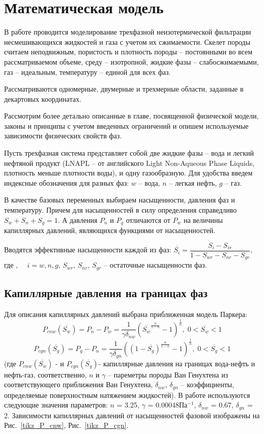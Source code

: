 %
\section{Математическая модель}
%
В работе проводится моделирование трехфазной неизотермической фильтрации 
несмешивающихся жидкостей и газа с учетом их сжимаемости. Скелет породы
считаем неподвижным, пористость и плотность породы -- постоянными во всем
рассматриваемом объеме, среду -- изотропной, жидкие фазы -- слабосжимаемыми,
газ -- идеальным, температуру -- единой для всех фаз.

Рассматриваются одномерные, двумерные и трехмерные
области, заданные в декартовых координатах.

Рассмотрим более детально описанные в главе, посвященной физической
модели, законы и принципы с учетом введенных ограничений и опишем
используемые зависимости физических свойств фаз.

Пусть трехфазная система представляет собой две жидкие фазы -- вода и легкий
нефтяной продукт (LNAPL -- от английского Light Non-Aqueous Phase Liquids,
плотность меньше плотности воды), и одну газообразную.
Для удобства введем индексные обозначения для разных фаз: $w$ -- вода, $n$ --
легкая нефть, $g$ -- газ.

В качестве базовых переменных выбираем насыщенности, давления фаз и температуру.
Причем для насыщенностей в силу определения справедливо  $S_w + S_n + S_g = 1$.
А давления $P_n$ и $P_g$ отличаются от $P_w$ на величины капиллярных
давлений, являющихся функциями от насыщенностей.

Вводятся эффективные насыщенности каждой из фаз:
$\overline{S_i}={\dfrac{S_i-S_{ir}}{1-S_{wr}-S_{nr}-S_{gr}}}$, где , ${\quad}i=w,n,g$, $S_{wr}$,
$S_{nr}$, $S_{gr}$ -- остаточные насыщенности фаз.

\subsection{Капиллярные давления на границах фаз}
Для описания
капиллярных давлений выбрана приближенная модель Паркера\cite{Parker}:
$$P_{cnw}(\overline{S_w})=P_n-P_w={\frac{1}{\gamma \delta_{nw}}}
\left( \overline{S_w}^{\frac{n}{1-n}}-1 \right)^\frac{1}{n},\;0<\overline{S_w}<1 $$
$$P_{cgn}(\overline{S_g})=P_g-P_n={\frac{1}{\gamma \delta_{gn}}}
\left( (1-\overline{S_g})^{\frac{n}{1-n}}-1 \right)^\frac{1}{n},\;0<\overline{S_g}<1$$
(где $P_{cnw}(\overline{S_w})$ - и $P_{cgn}(\overline{S_g})$- капиллярные давления на границах вода-нефть и нефть-газ, 
соответственно, $n$ и $\gamma $ -- пареметры породы Ван Генухтена из соответствующего приближения
Ван Генухтена\cite{Genuchten}, $\delta_{nw}$, $\delta_{gn}$ -- коэффициенты, определяемые поверхностным натяжением 
жидкостей). В работе используются следующие значения параметров: $n$ = 3.25, $\gamma $ = 0.00048Па$^{-1}$,
$\delta_{nw}$ = 0.67, $\delta_{gn}$ = 2. Зависимости капиллярных давлений от насыщенностей фазовой
изображены на Рис.~\ref{tikz_P_cnw}, Рис.~\ref{tikz_P_cgn}.

